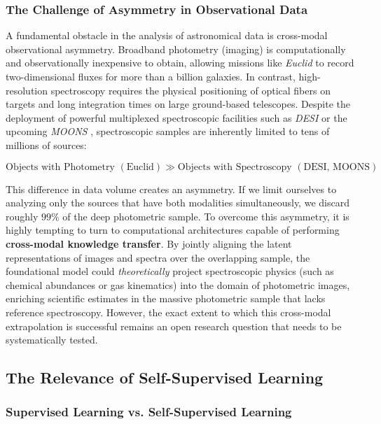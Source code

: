 \subsubsection{The Challenge of Asymmetry in Observational Data}

A fundamental obstacle in the analysis of astronomical data is cross-modal observational asymmetry. Broadband photometry (imaging) is computationally and observationally inexpensive to obtain, allowing missions like \textit{Euclid} to record two-dimensional fluxes for more than a billion galaxies. In contrast, high-resolution spectroscopy requires the physical positioning of optical fibers on targets and long integration times on large ground-based telescopes. Despite the deployment of powerful multiplexed spectroscopic facilities such as \textit{\gls{DESI}} or the upcoming \textit{\gls{MOONS}} \autocite{ar:cirasuolo-2020}, spectroscopic samples are inherently limited to tens of millions of sources:

\begin{equation}
  \text{Objects with Photometry } \left(\text{Euclid}\right) \gg \text{Objects with Spectroscopy } \left(\text{DESI, MOONS}\right)
  \label{eq:asimetria_datos}
\end{equation}

This difference in data volume creates an asymmetry. If we limit ourselves to analyzing only the sources that have both modalities simultaneously, we discard roughly $99\%$ of the deep photometric sample. To overcome this asymmetry, it is highly tempting to turn to computational architectures capable of performing \textbf{cross-modal knowledge transfer}. By jointly aligning the latent representations of images and spectra over the overlapping sample, the foundational model could \textit{theoretically} project spectroscopic physics (such as chemical abundances or gas kinematics) into the domain of photometric images, enriching scientific estimates in the massive photometric sample that lacks reference spectroscopy. However, the exact extent to which this cross-modal extrapolation is successful remains an open research question that needs to be systematically tested.


\subsection{The Relevance of Self-Supervised Learning}

\subsubsection{Supervised Learning vs. Self-Supervised Learning} \label{sec:in:versus}


